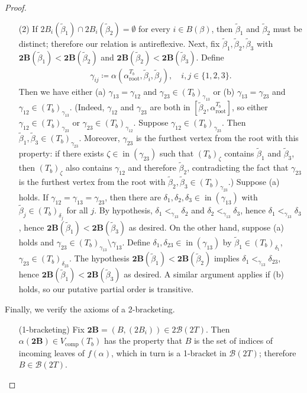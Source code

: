 \documentclass[11pt]{amsart}
\theoremstyle{definition}
\theoremstyle{remark}
\theoremstyle{plain}
\newcommand{\btB}{{\mathbf{2B}}}
\newcommand{\sB}{\mathscr{B}}
\newcommand{\stB}{2\mathscr{B}}
\newcommand{\on}{\operatorname}
\newcommand{\comp}{C^2}
\renewcommand{\comp}{{\on{comp}}}
\newcommand{\incom}{\on{in}}
\renewcommand{\root}{{\on{root}}}
\newcommand{\wt}{\widetilde}
\begin{document}
\begin{proof}
\begin{itemize}
\item[(2)] If $2B_i(\wt\beta_1) \cap 2B_i(\wt\beta_2) = \emptyset$ for every $i \in B(\beta)$, then $\wt\beta_1$ and $\wt\beta_2$ must be distinct; therefore our relation is antireflexive.
Next, fix $\wt\beta_1,\wt\beta_2,\wt\beta_3$ with $\btB(\wt\beta_1) < \btB(\wt\beta_2)$ and $\btB(\wt\beta_2) < \btB(\wt\beta_3)$.
Define \begin{align}
\gamma_{ij} \coloneqq \alpha(\alpha_\root^{T_b},\wt\beta_i,\wt\beta_j), \quad i,j \in \{1,2,3\}.
\end{align}
Then we have either (a) $\gamma_{13} = \gamma_{12}$ and $\gamma_{23} \in (T_b)_{\gamma_{13}}$ or (b) $\gamma_{13} = \gamma_{23}$ and $\gamma_{12} \in (T_b)_{\gamma_{13}}$.
(Indeed, $\gamma_{12}$ and $\gamma_{23}$ are both in $[\wt\beta_2,\alpha_\root^{T_b}]$, so either $\gamma_{12} \in (T_b)_{\gamma_{23}}$ or $\gamma_{23} \in (T_b)_{\gamma_{12}}$.
Suppose $\gamma_{12} \in (T_b)_{\gamma_{23}}$.
Then $\wt\beta_1,\wt\beta_3 \in (T_b)_{\gamma_{23}}$.
Moreover, $\gamma_{23}$ is the furthest vertex from the root with this property: if there exists $\zeta \in \incom(\gamma_{23})$ such that $(T_b)_\zeta$ contains $\wt\beta_1$ and $\wt\beta_3$, then $(T_b)_\zeta$ also contains $\gamma_{12}$ and therefore $\wt\beta_2$, contradicting the fact that $\gamma_{23}$ is the furthest vertex from the root with $\wt\beta_2, \wt\beta_3 \in (T_b)_{\gamma_{23}}$.)
Suppose (a) holds.
If $\gamma_{12} = \gamma_{13} = \gamma_{23}$, then there are $\delta_1,\delta_2,\delta_3 \in \incom(\gamma_{13})$ with $\wt\beta_j \in (T_b)_{\delta_j}$ for all $j$.
By hypothesis, $\delta_1 <_{\gamma_{13}} \delta_2$ and $\delta_2<_{\gamma_{13}}\delta_3$, hence $\delta_1 <_{\gamma_{13}} \delta_3$, hence $\btB(\wt\beta_1) < \btB(\wt\beta_3)$ as desired.
On the other hand, suppose (a) holds and $\gamma_{23} \in (T_b)_{\gamma_{13}} \setminus \gamma_{13}$.
Define $\delta_1, \delta_{23} \in \incom(\gamma_{13})$ by $\wt\beta_1 \in (T_b)_{\delta_1}$, $\gamma_{23} \in (T_b)_{\delta_{23}}$.
The hypothesis $\btB(\wt\beta_1) < \btB(\wt\beta_2)$ implies $\delta_1 <_{\gamma_{13}} \delta_{23}$, hence $\btB(\wt\beta_1) < \btB(\wt\beta_3)$ as desired.
A similar argument applies if (b) holds, so our putative partial order is transitive.
\end{itemize}

Finally, we verify the axioms of a 2-bracketing.
\begin{itemize}
\item[] {\sc(1-bracketing)} Fix $\btB = (B,(2B_i)) \in \stB(2T)$.
Then $\alpha(\btB) \in V_\comp(T_b)$ has the property that $B$ is the set of indices of incoming leaves of $f(\alpha)$, which in turn is a 1-bracket in $\sB(2T)$; therefore $B \in \sB(2T)$.


\end{itemize}
\end{proof}
\end{document}

